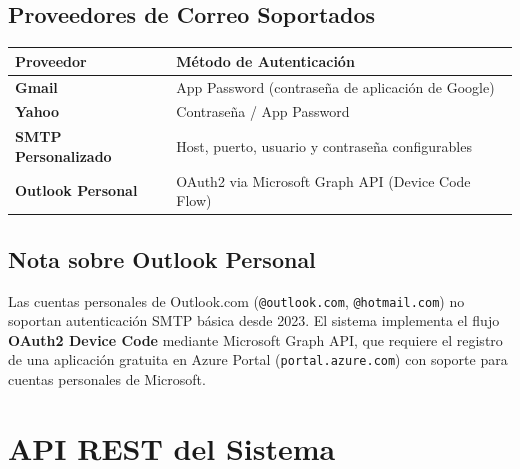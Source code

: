 \documentclass[12pt, letterpaper]{article}
\begin{document}
\subsection{Proveedores de Correo Soportados}

\begin{tabularx}{\linewidth}{>{\bfseries}l X}
  \toprule
  Proveedor          & Método de Autenticación                             \\
  \midrule
  Gmail              & App Password (contraseña de aplicación de Google)   \\
  Yahoo              & Contraseña / App Password                           \\
  SMTP Personalizado & Host, puerto, usuario y contraseña configurables    \\
  Outlook Personal   & OAuth2 via Microsoft Graph API (Device Code Flow)   \\
  \bottomrule
\end{tabularx}

\subsection{Nota sobre Outlook Personal}

Las cuentas personales de Outlook.com (\texttt{@outlook.com},
\texttt{@hotmail.com}) no soportan autenticación SMTP básica desde 2023.
El sistema implementa el flujo \textbf{OAuth2 Device Code} mediante
Microsoft Graph API, que requiere el registro de una aplicación gratuita
en Azure Portal (\texttt{portal.azure.com}) con soporte para cuentas
personales de Microsoft.

\section{API REST del Sistema}
\end{document}
